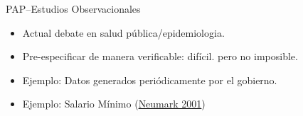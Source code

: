\documentclass{beamer}
\begin{document}
{ %
    \begin{frame}[plain]
     \end{frame}
}
\begin{frame}{PAP--Estudios Observacionales}
\begin{itemize}[<.->]
\item Actual debate en salud pública/epidemiologia.
\item Pre-especificar de manera verificable: difícil. pero no imposible.
\item Ejemplo: Datos generados periódicamente por el gobierno.
\item Ejemplo: Salario Mínimo (\href{http://onlinelibrary.wiley.com/doi/10.1111/0019-8676.00199/full}{Neumark 2001})
\end{itemize}
\end{frame}
\end{document}
